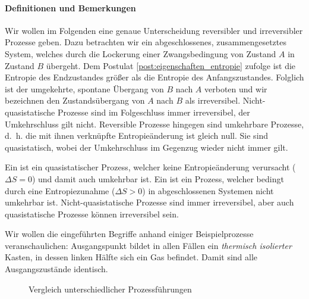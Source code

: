 \paragraph*{Definitionen und Bemerkungen }
Wir wollen im Folgenden eine genaue Unterscheidung reversibler und irreversibler Prozesse geben. 
Dazu betrachten wir ein abgeschlossenes, zusammengesetztes System, welches durch die Lockerung einer Zwangsbedingung von Zustand $A$
in Zustand $B$ übergeht. Dem Postulat \ref{post:eigenschaften_entropie} zufolge ist die Entropie des Endzustandes größer als die Entropie des Anfangszustandes.
Folglich ist der umgekehrte, spontane Übergang von $B$ nach $A$ \glqq verboten\grqq{} und wir bezeichnen den Zustandsübergang von $A$ nach $B$ als irreversibel. Nicht-quasistatische Prozesse sind im Folgeschluss immer irreversibel, der Umkehrschluss gilt nicht.
Reversible Prozesse hingegen sind umkehrbare Prozesse, d.~h. die mit ihnen verknüpfte Entropieänderung ist gleich null.
Sie sind quasistatisch, wobei der Umkehrschluss im Gegenzug wieder nicht immer gilt. %
\begin{formal}
    Ein  ist ein quasistatischer Prozess, welcher keine Entropieänderung verursacht ($\Delta S=0$) und damit auch umkehrbar ist. 
    Ein  ist ein Prozess, welcher bedingt durch eine Entropiezunahme ($\Delta S>0$) in abgeschlossenen Systemen nicht umkehrbar ist. Nicht-quasistatische Prozesse sind immer irreversibel, aber auch quasistatische Prozesse können irreversibel sein.
\end{formal}
Wir wollen die eingeführten Begriffe anhand einiger Beispielprozesse veranschaulichen:
Ausgangspunkt bildet in allen Fällen ein \emph{thermisch isolierter} Kasten, in dessen linken Hälfte sich ein Gas befindet. Damit sind alle Ausgangszustände identisch.
\begin{figure}[htbp]
    \centering
    \begin{subfigure}[b]{.32\textwidth}
        \centering
        \tfigProcessReversibleQuasistationary        
        \caption{}
        \label{fig:ProcessReversibleQuasistationary}
    \end{subfigure}
    \begin{subfigure}[b]{.32\textwidth}
        \centering
        \tfigProcessIrreversibleQuasistationary           
        \caption{}
        \label{fig:ProcessIrreversibleQuasistationary}
    \end{subfigure}
    \begin{subfigure}[b]{.32\textwidth}
        \centering     
        \tfigProcessIrreversibleNonquasistationary
        \caption{}
        \label{fig:ProcessIrreversibleNonquasistationary}
    \end{subfigure}
    \caption{Vergleich unterschiedlicher Prozessführungen}
    \label{fig:ProcessReversibleIrreversibleQuasistationary}
\end{figure}
